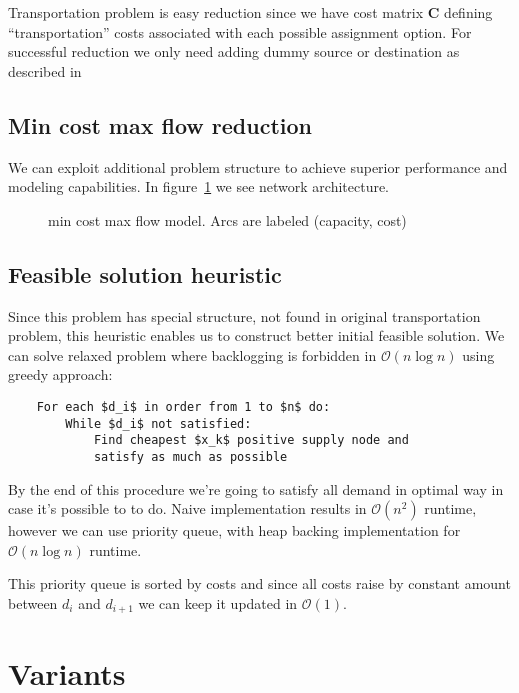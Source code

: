 Transportation problem \autocite{or-textbook} is easy reduction since we have cost matrix $\mathbf{C}$ defining ``transportation'' costs associated with each possible assignment option. For successful reduction we only need adding dummy source or destination as described in \autocite{or-textbook}

\subsection{Min cost max flow reduction}
\label{sub:Min cost max flow reduction}

We can exploit additional problem structure to achieve superior performance and modeling capabilities. In figure~\ref{fig:mcmf-model} we see network architecture.

\begin{figure}[h]
\label{fig:mcmf-model}
  \centering
  
  \caption{min cost max flow model. Arcs are labeled (capacity, cost)}
\end{figure}

\subsection{Feasible solution heuristic}
\label{subs:Feasible solution heuristic}
Since this problem has special structure, not found in original transportation problem, this heuristic enables us to construct better initial feasible solution. We can solve relaxed problem where backlogging is forbidden in $\mathcal{O}(n \log{} n)$ using greedy approach:

\begin{verbatim}
    For each $d_i$ in order from 1 to $n$ do:
        While $d_i$ not satisfied:
            Find cheapest $x_k$ positive supply node and
            satisfy as much as possible
\end{verbatim}

By the end of this procedure we're going to satisfy all demand in optimal way in case it's possible to to do. Naive implementation results in $\mathcal{O}(n^2)$ runtime, however we can use priority queue, with heap backing implementation for $\mathcal{O}(n\log{}n)$ runtime.

This priority queue is sorted by costs and since all costs raise by constant amount between $d_i$ and $d_{i+1}$ we can keep it updated in $\mathcal{O}(1)$.

\section{Variants}
\label{sec:Variants}

